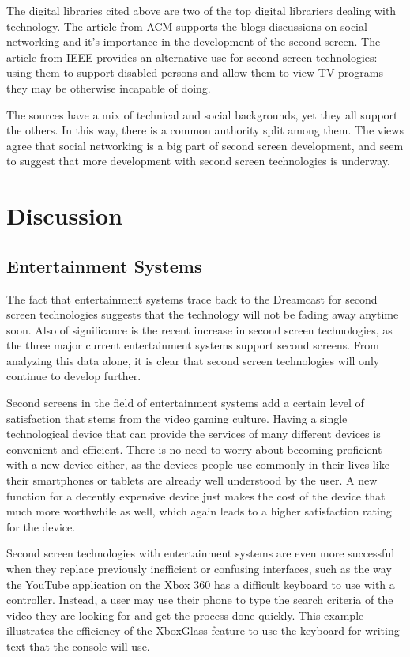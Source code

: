 \documentclass[11pt, oneside]{article}
\begin{document}
The digital libraries cited above are two of the top digital librariers dealing with technology. The article from ACM supports the blogs discussions on social networking and it's importance in the development of the second screen. The article from IEEE provides an alternative use for second screen technologies: using them to support disabled persons and allow them to view TV programs they may be otherwise incapable of doing.

The sources have a mix of technical and social backgrounds, yet they all support the others. In this way, there is a common authority split among them. The views agree that social networking is a big part of second screen development, and seem to suggest that more development with second screen technologies is underway.

\section{Discussion}

\subsection{Entertainment Systems}
The fact that entertainment systems trace back to the Dreamcast for second screen technologies suggests that the technology will not be fading away anytime soon. Also of significance is the recent increase in second screen technologies, as the three major current entertainment systems support second screens. From analyzing this data alone, it is clear that second screen technologies will only continue to develop further.

Second screens in the field of entertainment systems add a certain level of satisfaction that stems from the video gaming culture. Having a single technological device that can provide the services of many different devices is convenient and efficient. There is no need to worry about becoming proficient with a new device either, as the devices people use commonly in their lives like their smartphones or tablets are already well understood by the user. A new function for a decently expensive device just makes the cost of the device that much more worthwhile as well, which again leads to a higher satisfaction rating for the device. 

Second screen technologies with entertainment systems are even more successful when they replace previously inefficient or confusing interfaces, such as the way the YouTube application on the Xbox 360 has a difficult keyboard to use with a controller. Instead, a user may use their phone to type the search criteria of the video they are looking for and get the process done quickly. This example illustrates the efficiency of the XboxGlass feature to use the keyboard for writing text that the console will use. 
\end{document}
